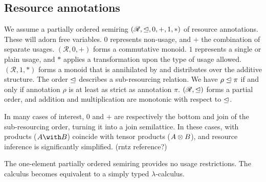\subsection{Resource annotations}

We assume a partially ordered semiring $(\mathscr{R}, \trianglelefteq, 0, +, 1, *)$ of
resource annotations.
These will adorn free variables.
$0$ represents non-usage, and $+$ the combination of separate usages.
$(\mathscr{R}, 0, +)$ forms a commutative monoid.
$1$ represents a single or plain usage, and $*$ applies a transformation upon
the type of usage allowed.
$(\mathscr{R}, 1, *)$ forms a monoid that is annihilated by and distributes over
the additive structure.
The order $\trianglelefteq$ describes a sub-resourcing relation.
We have $\rho \trianglelefteq \pi$ if and only if annotation $\rho$ is at least as strict as
annotation $\pi$.
$(\mathscr{R}, \trianglelefteq)$ forms a partial order, and addition and multiplication are
monotonic with respect to $\trianglelefteq$.

In many cases of interest, $0$ and $+$ are respectively the bottom and join of
the sub-resourcing order, turning it into a join semilattice.
In these cases, with products ($\withT{A}{B}$) coincide with tensor products
($A \otimes B$), and resource inference is significantly simplified.
(rntz reference?)

\begin{example}[Trivial]
  The one-element partially ordered semiring provides no usage restrictions.
  The calculus becomes equivalent to a simply typed $\lambda$-calculus.
\end{example}

